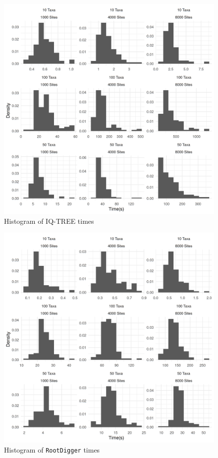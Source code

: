 \documentclass{article}
\newcommand{\RootDiggertt}{\texttt{RootDigger}}
\begin{document}
\begin{figure}
  \begin{center}
    \includegraphics[width=.9\linewidth]{./figs/timing_plots/iq_time_hist.png}
  \caption{Histogram of IQ-TREE times
  \label{fig:iq_time_results}}
\end{center}
\end{figure}

\begin{figure}
  \begin{center}
    \includegraphics[width=.9\linewidth]{./figs/timing_plots/rd_time_hist.png}
    \caption{Histogram of \RootDiggertt{} times
    \label{fig:rd_time_results}}
\end{center}
\end{figure}
\end{document}
